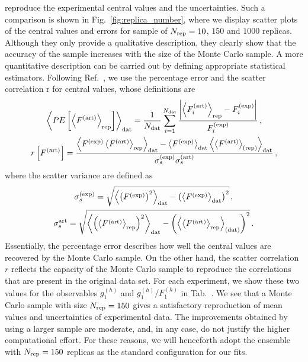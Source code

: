 reproduce the experimental central values and the uncertainties. Such a comparison is shown in Fig.~\ref{fig:replica_number}, where we display scatter plots of the central values and errors for sample of $N_{\textrm{rep}} = 10$, $150$ and $1000$ replicas. Although they only provide a qualitative description, they clearly show that the accuracy of the sample increases with the size of the Monte Carlo sample. A more quantitative description can be carried out by defining appropriate statistical estimators. Following Ref.~\cite{DelDebbio:2004xtd}, we use the percentage error and the scatter correlation r for central values, whose definitions are
%
\begin{gather}
  \left< PE \left[ \left< F^{(\textrm{art})} \right>_{\textrm{rep}} \right] \right>_{\textrm{dat}} = \frac{1}{N_{\textrm{dat}}} \sum_{i=1}^{N_{\textrm{dat}}} \frac{\abs{\left< F_i^{\textrm{(art)}} \right>_{\textrm{rep}} - F_{i}^{\textrm{(exp)}}}}{F_i^{\textrm{(exp)}}}\,, \\
  r \left[ F^{\textrm{(art)}} \right] = \frac{\left< F^{\textrm{(exp)}} \left< F^{\textrm{(art)}} \right>_{\textrm{rep}} \right>_{\textrm{dat}} - \left< F^{\textrm{(exp)}} \right>_{\textrm{dat}} \left<  \left< F^{\textrm{(art)}} \right>_{\textrm{(rep)}}\right>_{\textrm{dat}} }{\sigma_s^{\textrm{(exp)}} \sigma_s^{\textrm{(art)}} }\,,
\end{gather}
where the scatter variance are defined as
\begin{gather}
  \sigma^{\textrm{(exp)}}_s = \sqrt{\left< \left( F^{\textrm{(exp)}} \right)^2 \right>_{\textrm{dat}} - \left( \left< F^{\textrm{(exp)}} \right>_{\textrm{dat}} \right)^2} \,,\\
  \sigma^{\textrm{art}}_s = \sqrt{\left< \left( \left<F^{\textrm{(art)}}\right>_{\textrm{rep}} \right)^2 \right>_{\textrm{dat}} - \left( \left< \left<F^{\textrm{(art)}}\right>_{\textrm{rep}} \right>_{\textrm{(dat)}} \right)^2} \,.
\end{gather}
Essentially, the percentage error describes how well the central values are recovered by the Monte Carlo sample. On the other hand, the scatter correlation $r$ reflects the capacity of the Monte Carlo sample to reproduce the correlations that are present in the original data set. For each experiment, we show these two values for the observables $g_1^{(h)}$ and $g_1^{(h)}/F_1^{(h)}$ in Tab.~. We see that a Monte Carlo sample with size $N_{\textrm{rep}} = 150$ gives a satisfactory reproduction of mean values and uncertainties of experimental data. The improvements obtained by using a larger sample are moderate, and, in any case, do not justify the higher computational effort. For these reasons, we will henceforth adopt the ensemble with $N_{\textrm{rep}} = 150$ replicas as the standard configuration for our fits.

